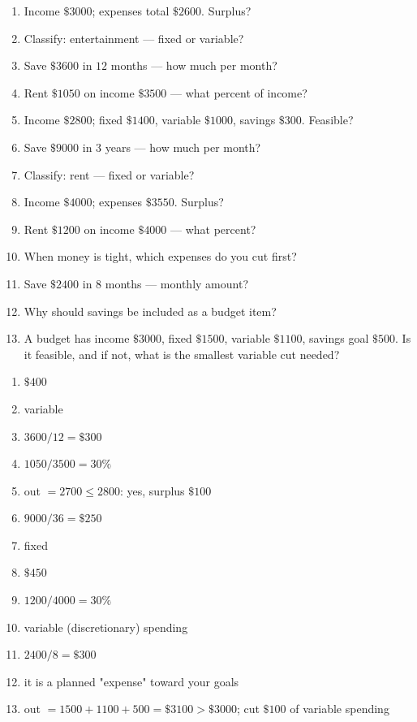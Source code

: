 \documentclass[11pt]{article}
\begin{document}
\begin{recapbox}
\begin{multicols}{2}
\small
\begin{enumerate}[leftmargin=*,itemsep=3pt]
  \item Income $\$3000$; expenses total $\$2600$. Surplus?
  \item Classify: entertainment — fixed or variable?
  \item Save $\$3600$ in $12$ months — how much per month?
  \item Rent $\$1050$ on income $\$3500$ — what percent of income?
  \item Income $\$2800$; fixed $\$1400$, variable $\$1000$, savings $\$300$. Feasible?
  \item Save $\$9000$ in $3$ years — how much per month?
  \item Classify: rent — fixed or variable?
  \item Income $\$4000$; expenses $\$3550$. Surplus?
  \item Rent $\$1200$ on income $\$4000$ — what percent?
  \item When money is tight, which expenses do you cut first?
  \item Save $\$2400$ in $8$ months — monthly amount?
  \item Why should savings be included as a budget item?
  \item A budget has income $\$3000$, fixed $\$1500$, variable $\$1100$, savings goal $\$500$. Is it feasible, and if not, what is the smallest variable cut needed?
\end{enumerate}
\end{multicols}
\end{recapbox}

\begin{keybox}
\begin{multicols}{2}
\small
\begin{enumerate}[leftmargin=*,itemsep=3pt]
  \item $\$400$
  \item variable
  \item $3600/12=\$300$
  \item $1050/3500=30\%$
  \item out $=2700\le2800$: yes, surplus $\$100$
  \item $9000/36=\$250$
  \item fixed
  \item $\$450$
  \item $1200/4000=30\%$
  \item variable (discretionary) spending
  \item $2400/8=\$300$
  \item it is a planned "expense" toward your goals
  \item out $=1500+1100+500=\$3100>\$3000$; cut $\$100$ of variable spending
\end{enumerate}
\end{multicols}
\end{keybox}
\end{document}
